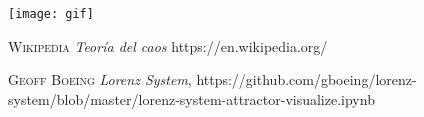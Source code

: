 \documentclass[12pt]{article}
\begin{document}
\begin{center}
\texttt{[image: gif]}
\end{center}

\newpage
\renewcommand{\refname}{\section*{Bibliografía}}
\begin{thebibliography}{9}




 \textsc{Wikipedia}
\textit{Teoría del caos} https://en.wikipedia.org/

 \textsc{Geoff Boeing}
\textit{Lorenz System}, 
https://github.com/gboeing/lorenz-system/blob/master/lorenz-system-attractor-visualize.ipynb


\end{thebibliography}
\end{document}

